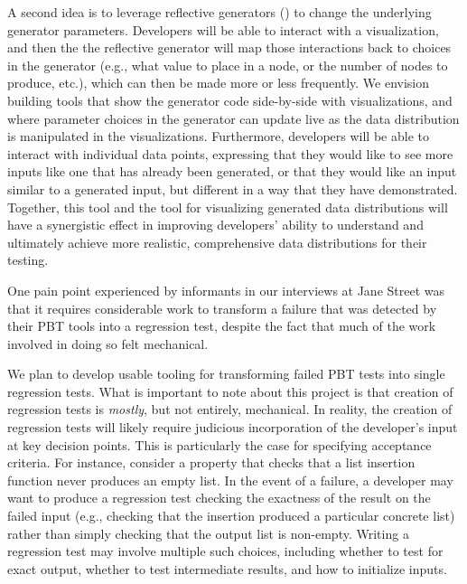 A second idea is to leverage
reflective generators () to change the underlying
generator parameters. Developers will be able to interact with a visualization,
and then the the reflective generator will map those interactions
back to choices
in the generator (e.g., what value to place in a node, or the number of nodes to
produce, etc.), which can then be made more or less frequently. We envision
building tools that show the generator code
side-by-side with visualizations, and where parameter choices in the generator
can update live as the data distribution is manipulated in the visualizations.
Furthermore, developers will be able to interact with individual data points,
expressing that they would like to see more inputs like one that has already
been generated, or that they would like an input similar to a generated input,
but different in a way that they have demonstrated. Together, this tool and the
tool for visualizing generated data distributions will have a synergistic effect
in improving developers' ability to understand and ultimately achieve more
realistic, comprehensive data distributions for their testing.

%
One pain
point experienced
by informants in our interviews at Jane Street was that it requires considerable work to
transform a failure that was detected by their PBT tools into a
regression test, despite the fact that much of the work involved in doing so
felt mechanical.

We plan to develop usable tooling for transforming failed PBT tests into single
regression tests. What is important to note about this project is that creation
of regression tests is \emph{mostly}, but not entirely, mechanical. In reality,
the creation of regression tests will likely require judicious incorporation of
the developer's input at key decision points. This is particularly the case for
specifying acceptance criteria. For instance, consider a property that checks
that a list insertion function never produces an empty list. In the event of a
failure, a developer may want to produce a regression test checking the
exactness of the result on the failed input (e.g., checking that the insertion
produced a particular concrete list) rather than simply checking that the output
list is non-empty.  Writing a regression test may involve multiple such
choices, including whether to test for exact output, whether to test
intermediate results, and how to initialize inputs.

